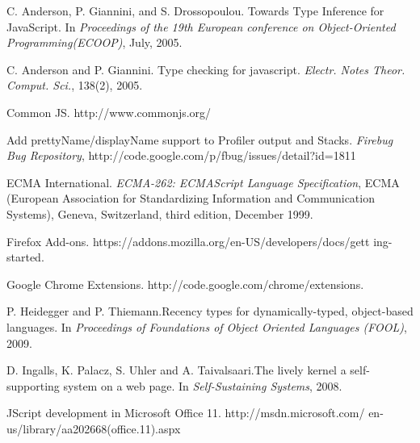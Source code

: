 \documentclass[10pt, preprint]{sigplanconf}
\begin{document}


%



\begin{thebibliography}{}
\softraggedright


C. Anderson, P. Giannini, and S. Drossopoulou. \newblock Towards Type Inference for JavaScript.
\newblock In \emph{Proceedings of the 19th European conference on Object-Oriented Programming(ECOOP)},
July, 2005.

C. Anderson and P. Giannini. \newblock Type checking for javascript.
\newblock \emph{Electr. Notes Theor. Comput. Sci.}, 138(2), 2005. 

Common JS.
\newblock http://www.commonjs.org/

Add prettyName/displayName support to Profiler output and Stacks.
\newblock \emph{Firebug Bug Repository},
\newblock http://code.google.com/p/fbug/issues/detail?id=1811

ECMA International.
\newblock \emph{ECMA-262: ECMAScript Language Specification},
ECMA (European Association for Standardizing Information
and Communication Systems), Geneva, Switzerland, third edition,
December 1999. 

Firefox Add-ons.
\newblock https://addons.mozilla.org/en-US/developers/docs/gett ing-started.

Google Chrome Extensions.
\newblock http://code.google.com/chrome/extensions.

P. Heidegger and P. Thiemann.\newblock Recency types for dynamically-typed, object-based languages.
\newblock In \emph{Proceedings of Foundations of Object Oriented Languages (FOOL)},
2009.

D. Ingalls, K. Palacz, S. Uhler and A. Taivalsaari.\newblock The lively kernel a self-supporting system on
a web page.
\newblock In \emph{Self-Sustaining Systems},
2008.

JScript development in Microsoft Office 11.
\newblock http://msdn.microsoft.com/ en-us/library/aa202668(office.11).aspx


\end{thebibliography}
\end{document}
